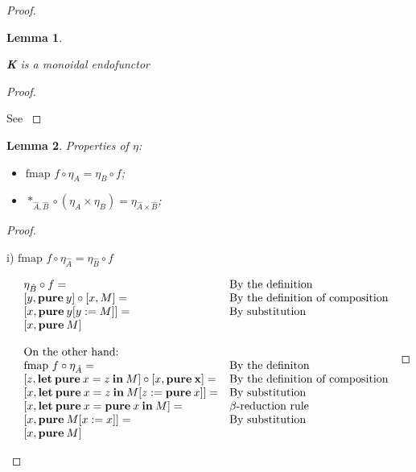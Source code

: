 \documentclass[a4paper]{article}
\newtheorem{lemma}{Lemma}
\begin{document}
\begin{proof}
\begin{lemma}
  $ $

  {\bf K} is a monoidal endofunctor
\end{lemma}

\begin{proof}
$ $

See \cite{ModalK}
\end{proof}

\begin{lemma} Properties of $\eta$:

\begin{itemize}
  \item $\text{fmap } f \circ \eta_A = \eta_B \circ f$;
  \item $\ast_{\hat{A},\hat{B}} \circ (\eta_{A} \times \eta_{B}) = \eta_{\hat{A} \times \hat{B}}$;
\end{itemize}
\end{lemma}

\begin{proof}
  $ $

  i) $\text{fmap } f \circ \eta_{\hat{A}} = \eta_{\hat{B}} \circ f$

\vspace{\baselineskip}

$\begin{array}{lll}
&\eta_{\hat{B}} \circ f = & \text{By the definition} \\
&[y, {\bf pure \:} y] \circ [x, M] = & \text{By the definition of composition}\\
&[x, {\bf pure \:} y [y := M]] = & \text{By substitution}\\
&[x, {\bf pure \:} M]& \\
& &\\
&\text{On the other hand:}& \\
&\text{fmap } f \circ \eta_{\hat{A}} = & \text{By the definiton} \\
&[z, {\bf let \: pure \:} x = z {\: \bf in \:} M] \circ [x, {\bf pure \: x}] = & \text{By the definition of composition}\\
&[x, {\bf let \: pure \:} x = z {\: \bf in \:} M [z := {\bf pure \:} x]] = & \text{By substitution} \\
&[x, {\bf let \: pure \:} x = {\bf pure \:} x {\: \bf in \:} M] = & \text{$\beta$-reduction rule}\\
&[x, {\bf pure \:} M [x := x]] = & \text{By substitution}\\
&[x, {\bf pure \:} M]&
\end{array}$


\end{proof}
\end{proof}
\end{document}
